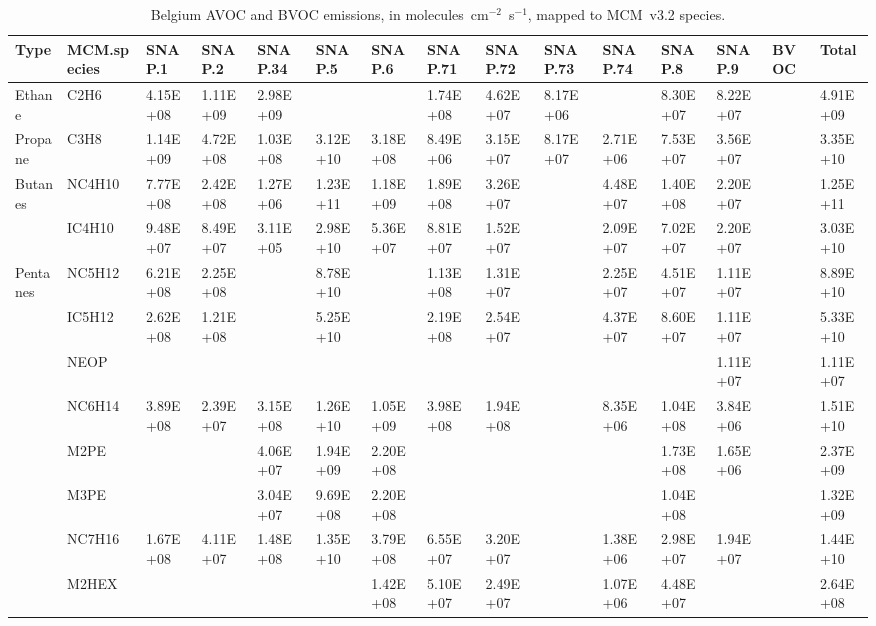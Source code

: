 \tiny
\begin{longtable}{lllllllllllllll}
	\caption{Belgium AVOC and BVOC emissions, in molecules~cm$^{-2}$~s$^{-1}$, mapped to MCM~v3.2 species.}\\%
	\hline \hline
	\textbf{Type} & \textbf{MCM.species} & \textbf{SNAP.1} & \textbf{SNAP.2} & \textbf{SNAP.34} & \textbf{SNAP.5} & \textbf{SNAP.6} & \textbf{SNAP.71} & \textbf{SNAP.72} & \textbf{SNAP.73} & \textbf{SNAP.74} & \textbf{SNAP.8} & \textbf{SNAP.9} & \textbf{BVOC} & \textbf{Total}\\
	\endhead
	\hline
	Ethane & C2H6 & 4.15E+08 & 1.11E+09 & 2.98E+09 &  &  & 1.74E+08 & 4.62E+07 & 8.17E+06 &  & 8.30E+07 & 8.22E+07 &  & 4.91E+09 \\
	\hline Propane & C3H8 & 1.14E+09 & 4.72E+08 & 1.03E+08 & 3.12E+10 & 3.18E+08 & 8.49E+06 & 3.15E+07 & 8.17E+07 & 2.71E+06 & 7.53E+07 & 3.56E+07 &  & 3.35E+10 \\ \hline
	\multirow{2}{*}{Butanes} & NC4H10 & 7.77E+08 & 2.42E+08 & 1.27E+06 & 1.23E+11 & 1.18E+09 & 1.89E+08 & 3.26E+07 &  & 4.48E+07 & 1.40E+08 & 2.20E+07 &  & 1.25E+11 \\
	 & IC4H10 & 9.48E+07 & 8.49E+07 & 3.11E+05 & 2.98E+10 & 5.36E+07 & 8.81E+07 & 1.52E+07 &  & 2.09E+07 & 7.02E+07 & 2.20E+07 &  & 3.03E+10 \\
	\hline \multirow{3}{*}{Pentanes} & NC5H12 & 6.21E+08 & 2.25E+08 &  & 8.78E+10 &  & 1.13E+08 & 1.31E+07 &  & 2.25E+07 & 4.51E+07 & 1.11E+07 &  & 8.89E+10 \\
	 & IC5H12 & 2.62E+08 & 1.21E+08 &  & 5.25E+10 &  & 2.19E+08 & 2.54E+07 &  & 4.37E+07 & 8.60E+07 & 1.11E+07 &  & 5.33E+10 \\
	 & NEOP &  &  &  &  &  &  &  &  &  &  & 1.11E+07 &  & 1.11E+07 \\
	\hline \parbox[t]{2mm}{} & NC6H14 & 3.89E+08 & 2.39E+07 & 3.15E+08 & 1.26E+10 & 1.05E+09 & 3.98E+08 & 1.94E+08 &  & 8.35E+06 & 1.04E+08 & 3.84E+06 &  & 1.51E+10 \\
	 & M2PE &  &  & 4.06E+07 & 1.94E+09 & 2.20E+08 &  &  &  &  & 1.73E+08 & 1.65E+06 &  & 2.37E+09 \\
	 & M3PE &  &  & 3.04E+07 & 9.69E+08 & 2.20E+08 &  &  &  &  & 1.04E+08 &  &  & 1.32E+09 \\
	 & NC7H16 & 1.67E+08 & 4.11E+07 & 1.48E+08 & 1.35E+10 & 3.79E+08 & 6.55E+07 & 3.20E+07 &  & 1.38E+06 & 2.98E+07 & 1.94E+07 &  & 1.44E+10 \\
	 & M2HEX &  &  &  &  & 1.42E+08 & 5.10E+07 & 2.49E+07 &  & 1.07E+06 & 4.48E+07 &  &  & 2.64E+08 \\

\end{longtable}
